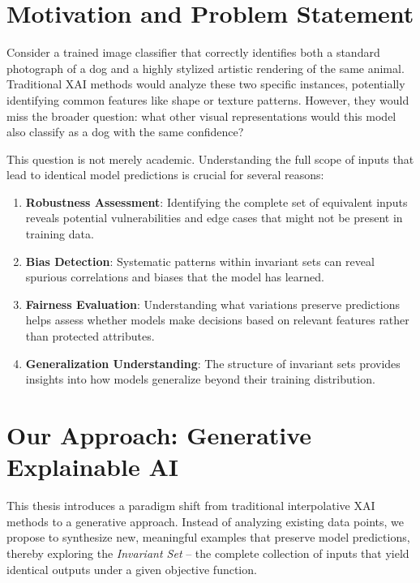 \documentclass[licencjacka,en]{pracamgr}
\begin{document}
\section{Motivation and Problem Statement}

Consider a trained image classifier that correctly identifies both a standard photograph of a dog and a highly stylized artistic rendering of the same animal. Traditional XAI methods would analyze these two specific instances, potentially identifying common features like shape or texture patterns. However, they would miss the broader question: what other visual representations would this model also classify as a dog with the same confidence?

This question is not merely academic. Understanding the full scope of inputs that lead to identical model predictions is crucial for several reasons:

\begin{enumerate}
\item \textbf{Robustness Assessment}: Identifying the complete set of equivalent inputs reveals potential vulnerabilities and edge cases that might not be present in training data.

\item \textbf{Bias Detection}: Systematic patterns within invariant sets can reveal spurious correlations and biases that the model has learned.

\item \textbf{Fairness Evaluation}: Understanding what variations preserve predictions helps assess whether models make decisions based on relevant features rather than protected attributes.

\item \textbf{Generalization Understanding}: The structure of invariant sets provides insights into how models generalize beyond their training distribution.
\end{enumerate}

\section{Our Approach: Generative Explainable AI}

This thesis introduces a paradigm shift from traditional interpolative XAI methods to a generative approach. Instead of analyzing existing data points, we propose to synthesize new, meaningful examples that preserve model predictions, thereby exploring the \textit{Invariant Set} -- the complete collection of inputs that yield identical outputs under a given objective function.
\end{document}
